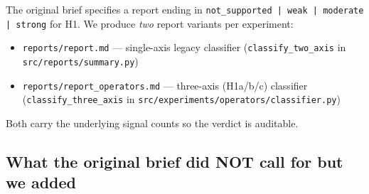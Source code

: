 \documentclass{article}
\theoremstyle{plain}
\theoremstyle{definition}
\begin{document}
The original brief specifies a report ending in
\texttt{not\_supported | weak | moderate | strong} for H1. We produce \textit{two}
report variants per experiment:

\begin{itemize}
  \item \texttt{reports/report.md} — single-axis legacy classifier
  (\texttt{classify\_two\_axis} in \texttt{src/reports/summary.py})
  \item \texttt{reports/report\_operators.md} — three-axis (H1a/b/c) classifier
  (\texttt{classify\_three\_axis} in \texttt{src/experiments/operators/classifier.py})
\end{itemize}

Both carry the underlying signal counts so the verdict is auditable.

\subsection{What the original brief did NOT call for but we added}
\end{document}
